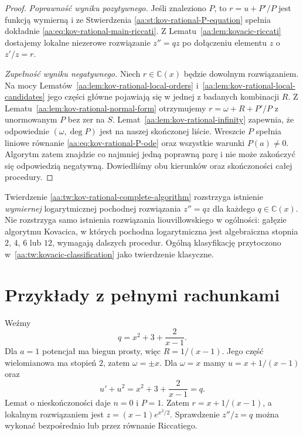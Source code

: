 \begin{proof}
\emph{Poprawność wyniku pozytywnego.}
Jeśli znaleziono $P$,
to $r=u+P'/P$ jest
funkcją wymierną i
ze Stwierdzenia
\ref{aa:st:kov-rational-P-equation}
spełnia dokładnie
\eqref{aa:eq:kov-rational-main-riccati}.
Z Lematu~\ref{aa:lem:kovacic-riccati}
dostajemy lokalne niezerowe
rozwiązanie $z''=qz$
po dołączeniu elementu
$z$ o $z'/z=r$.

\emph{Zupełność wyniku negatywnego.}
Niech $r\in\mathbb C(x)$
będzie dowolnym rozwiązaniem.
Na mocy
Lematów~\ref{aa:lem:kov-rational-local-orders}
i~\ref{aa:lem:kov-rational-local-candidates}
jego części główne pojawiają
się w jednej z badanych
kombinacji $R$.
Z Lematu~\ref{aa:lem:kov-rational-normal-form}
otrzymujemy $r=\omega+R+P'/P$
z unormowanym $P$
bez zer na $S$.
Lemat~\ref{aa:lem:kov-rational-infinity}
zapewnia, że odpowiednie
$(\omega,\deg P)$ jest
na naszej skończonej liście.
Wreszcie $P$ spełnia
liniowe równanie
\eqref{aa:eq:kov-rational-P-ode}
oraz wszystkie warunki
$P(a)\ne0$.
Algorytm zatem znajdzie
co najmniej jedną
poprawną parę i nie
może zakończyć się odpowiedzią
negatywną.
Dowiedliśmy obu kierunków
oraz skończoności całej procedury.
\end{proof}

\begin{uwaga}
\label{aa:uw:kov-rational-not-all}
Twierdzenie
\ref{aa:tw:kov-rational-complete-algorithm}
rozstrzyga istnienie
\emph{wymiernej} logarytmicznej
pochodnej rozwiązania
$z''=qz$ dla każdego
$q\in\mathbb C(x)$.
Nie rozstrzyga samo
istnienia rozwiązania
liouvillowskiego w ogólności:
gałęzie algorytmu Kovacica,
w których pochodna
logarytmiczna jest algebraiczna
stopnia $2$, $4$, $6$ lub $12$,
wymagają dalszych procedur.
Ogólną klasyfikację przytoczono
w~\ref{aa:tw:kovacic-classification}
jako twierdzenie klasyczne.
\end{uwaga}

\section{Przykłady z pełnymi rachunkami}

\begin{przyklad}
\label{aa:prz:kov-rational-simple}
Weźmy
\[
 q=x^2+3+\frac2{x-1}.
\]
Dla $a=1$ potencjał ma
biegun prosty, więc
$R=1/(x-1)$.
Jego część wielomianowa
ma stopień $2$, zatem
$\omega=\pm x$.
Dla $\omega=x$ mamy
$u=x+1/(x-1)$ oraz
\[
 u'+u^2
 =x^2+3+\frac2{x-1}=q.
\]
Lemat o nieskończoności
daje $n=0$ i $P=1$.
Zatem $r=x+1/(x-1)$,
a lokalnym rozwiązaniem
jest $z=(x-1)e^{x^2/2}$.
Sprawdzenie $z''/z=q$
można wykonać bezpośrednio
lub przez równanie Riccatiego.
\end{przyklad}

